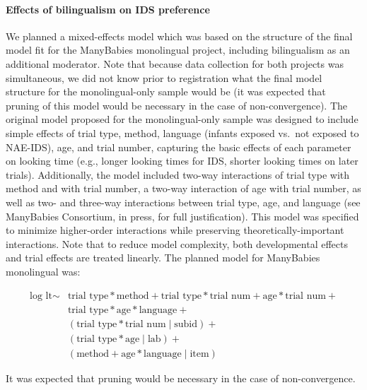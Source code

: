 \documentclass[,man,floatsintext]{apa6}
\let\oldparagraph\paragraph
\renewcommand{\paragraph}[1]{\oldparagraph{#1}\mbox{}}
\begin{document}
\hypertarget{effects-of-bilingualism-on-ids-preference}{%
\paragraph{Effects of bilingualism on IDS preference}\label{effects-of-bilingualism-on-ids-preference}}

We planned a mixed-effects model which was based on the structure of the final model fit for the ManyBabies monolingual project, including bilingualism as an additional moderator. Note that because data collection for both projects was simultaneous, we did not know prior to registration what the final model structure for the monolingual-only sample would be (it was expected that pruning of this model would be necessary in the case of non-convergence). The original model proposed for the monolingual-only sample was designed to include simple effects of trial type, method, language (infants exposed vs.~not exposed to NAE-IDS), age, and trial number, capturing the basic effects of each parameter on looking time (e.g., longer looking times for IDS, shorter looking times on later trials). Additionally, the model included two-way interactions of trial type with method and with trial number, a two-way interaction of age with trial number, as well as two- and three-way interactions between trial type, age, and language (see ManyBabies Consortium, in press, for full justification). This model was specified to minimize higher-order interactions while preserving theoretically-important interactions. Note that to reduce model complexity, both developmental effects and trial effects are treated linearly. The planned model for ManyBabies monolingual was:

\begin{equation}
\begin{split}
\text{log lt} \sim & \text{trial type} * \text{method} + \text{trial type} * \text{trial num} + \text{age} * \text{trial num} + \\
& \text{trial type} * \text{age} * \text{language} + \\
& (\text{trial type} * \text{trial num} \mid \text{subid}) + \\
& (\text{trial type} * \text{age} \mid \text{lab}) + \\
& (\text{method} + \text{age} * \text{language} \mid \text{item})
\end{split}
\end{equation}

It was expected that pruning would be necessary in the case of non-convergence.
\end{document}
